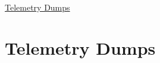 \hyperlink{telemetry_dumps}{Telemetry Dumps} \hypertarget{telemetry_dumps}{}\section{Telemetry Dumps}\label{telemetry_dumps}
